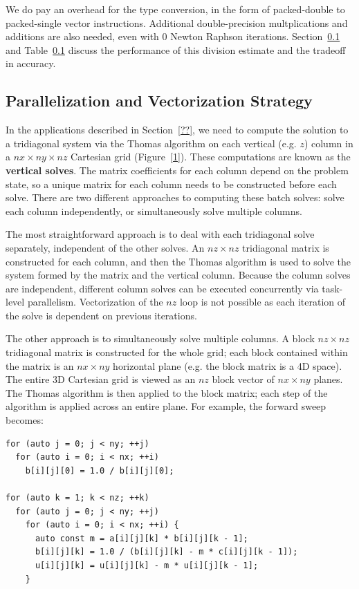 \documentclass[conference]{IEEEtran}
\begin{document}
We do pay an overhead for the type conversion, in the form of packed-double to
packed-single vector instructions. Additional double-precision multplications
and additions are also needed, even with 0 Newton Raphson iterations.
Section~\ref{} and Table~\ref{} discuss the performance of this division
estimate and the tradeoff in accuracy.


\subsection{Parallelization and Vectorization Strategy}

In the applications described in Section~\ref{??}, we need to compute the
solution to a tridiagonal system via the Thomas algorithm on each vertical
(e.g. $z$) column in a $nx \times ny \times nz$ Cartesian grid (Figure~\ref{1}).
These computations are known as the \textbf{vertical solves}. The matrix
coefficients for each column depend on the problem state, so a unique matrix
for each column needs to be constructed before each solve. There are two
different approaches to computing these batch solves: solve each column
independently, or simultaneously solve multiple columns.

The most straightforward approach is to deal with each tridiagonal solve
separately, independent of the other solves. An $nz\times nz$ tridiagonal
matrix is constructed for each column, and then the Thomas algorithm is used to
solve the system formed by the matrix and the vertical column. Because the
column solves are independent, different column solves can be executed
concurrently via task-level parallelism. Vectorization of the $nz$ loop is
not possible as each iteration of the solve is dependent on previous iterations.

The other approach is to simultaneously solve multiple columns. A block
$nz \times nz$ tridiagonal matrix is constructed for the whole grid; each block
contained within the matrix is an $nx \times ny$ horizontal plane (e.g. the
block matrix is a 4D space). The entire 3D Cartesian grid is viewed as an
$nz$ block vector of $nx \times ny$ planes. The Thomas algorithm is then
applied to the block matrix; each step of the algorithm is applied across an
entire plane. For example, the forward sweep becomes:

\begin{lstlisting}
for (auto j = 0; j < ny; ++j)
  for (auto i = 0; i < nx; ++i) 
    b[i][j][0] = 1.0 / b[i][j][0];

for (auto k = 1; k < nz; ++k)
  for (auto j = 0; j < ny; ++j)
    for (auto i = 0; i < nx; ++i) {
      auto const m = a[i][j][k] * b[i][j][k - 1];
      b[i][j][k] = 1.0 / (b[i][j][k] - m * c[i][j][k - 1]);
      u[i][j][k] = u[i][j][k] - m * u[i][j][k - 1];
    } 
\end{lstlisting}
\end{document}
